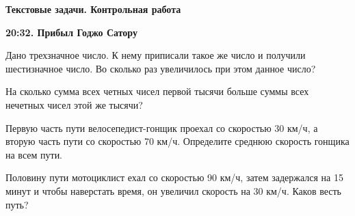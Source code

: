 \centerline{\bf \Huge Текстовые задачи. Контрольная работа}
\centerline{\bf \Huge }

\begin{flushright}
        \scriptsize{\textbf{20:32. Прибыл Годжо Сатору}}
\end{flushright}


 Дано трехзначное число. К нему приписали такое же число и получили шестизначное число. Во сколько раз увеличилось при этом данное число?

 На сколько сумма всех четных чисел первой тысячи больше суммы всех нечетных чисел этой же тысячи?

 Первую часть пути велосепедист-гонщик проехал со скоростью 30 км/ч, а вторую часть пути со скоростью 70 км/ч. Определите среднюю скорость гонщика на всем пути.

 Половину пути мотоциклист ехал со скоростью 90 км/ч, затем задержался на 15 минут и чтобы наверстать время, он увеличил скорость на 30 км/ч. Каков весть путь?

